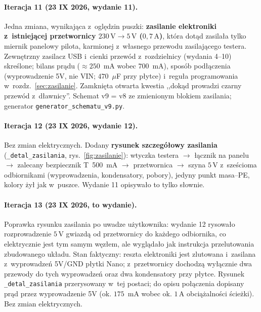 \documentclass[a4paper,11pt]{article}
\newcommand{\volt}{\,\mathrm{V}}
\newcommand{\amp}{\,\mathrm{A}}
\begin{document}
\paragraph{Iteracja 11 (23 IX 2026, wydanie 11).} Jedna zmiana, wynikająca z~oględzin
puszki: \textbf{zasilanie elektroniki z~istniejącej przetwornicy $230\volt\to5\volt$
($0{,}7\amp$)}, która dotąd zasilała tylko miernik panelowy pilota, karmionej
z~własnego przewodu zasilającego testera. Zewnętrzny zasilacz USB i~cienki przewód
z~rozdzielnicy (wydania 4--10) skreślone; bilans prądu ($\approx250$~mA wobec
$700$~mA), sposób podłączenia (wyprowadzenie 5V, nie VIN; $470$~$\mu$F przy
płytce) i~reguła programowania w~rozdz.~\ref{sec:zasilanie}. Zamknięta otwarta
kwestia ,,dokąd prowadzi czarny przewód z~dławnicy''. Schemat v9 = v8 ze zmienionym
blokiem zasilania; generator \texttt{generator\_schematu\_v9.py}.

\paragraph{Iteracja 12 (23 IX 2026, wydanie 12).} Bez zmian elektrycznych. Dodany
\textbf{rysunek szczegółowy zasilania} (\texttt{\_detal\_zasilania}, rys.~\ref{fig:zasilanie}):
wtyczka testera $\to$ łącznik na panelu $\to$ zalecany bezpiecznik T~500~mA $\to$
przetwornica $\to$ szyna $5\volt$ z~sześcioma odbiornikami (wyprowadzenia, kondensatory,
pobory), jedyny punkt masa--PE, kolory żył jak w~puszce. Wydanie 11 opisywało to tylko
słownie.

\paragraph{Iteracja 13 (23 IX 2026, to wydanie).} Poprawka rysunku zasilania po
uwadze użytkownika: wydanie 12 rysowało rozprowadzenie $5\volt$ gwiazdą od
przetwornicy do każdego odbiornika, co elektrycznie jest tym samym węzłem, ale
wyglądało jak instrukcja przelutowania zbudowanego układu. Stan faktyczny: reszta
elektroniki jest zlutowana i~zasilana z~wyprowadzeń 5V/GND płytki Nano; z~przetwornicy
dochodzą wyłącznie dwa przewody do tych wyprowadzeń oraz dwa kondensatory przy
płytce. Rysunek \texttt{\_detal\_zasilania} przerysowany w~tej postaci; do opisu
połączenia dopisany prąd przez wyprowadzenie 5V (ok. $175$~mA wobec ok. $1\amp$
obciążalności ścieżki). Bez zmian elektrycznych.
\end{document}
